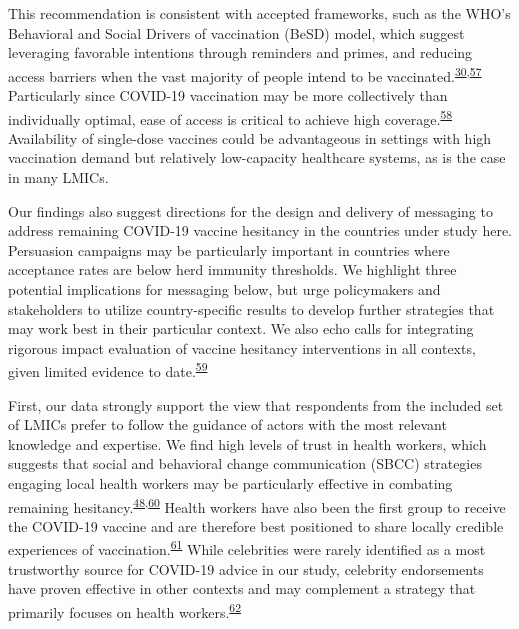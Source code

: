 \documentclass[
  12pt,
]{article}
\begin{document}
This recommendation is consistent with accepted frameworks, such as the WHO's Behavioral and Social Drivers of vaccination (BeSD) model, which suggest leveraging favorable intentions through reminders and primes, and reducing access barriers when the vast majority of people intend to be vaccinated.\textsuperscript{\protect\hyperlink{ref-whodata}{30},\protect\hyperlink{ref-brewer2017increasing}{57}} Particularly since COVID-19 vaccination may be more collectively than individually optimal, ease of access is critical to achieve high coverage.\textsuperscript{\protect\hyperlink{ref-betsch2013inviting}{58}} Availability of single-dose vaccines could be advantageous in settings with high vaccination demand but relatively low-capacity healthcare systems, as is the case in many LMICs.

Our findings also suggest directions for the design and delivery of messaging to address remaining COVID-19 vaccine hesitancy in the countries under study here. Persuasion campaigns may be particularly important in countries where acceptance rates are below herd immunity thresholds. We highlight three potential implications for messaging below, but urge policymakers and stakeholders to utilize country-specific results to develop further strategies that may work best in their particular context. We also echo calls for integrating rigorous impact evaluation of vaccine hesitancy interventions in all contexts, given limited evidence to date.\textsuperscript{\protect\hyperlink{ref-dube2015strategies}{59}}

First, our data strongly support the view that respondents from the included set of LMICs prefer to follow the guidance of actors with the most relevant knowledge and expertise. We find high levels of trust in health workers, which suggests that social and behavioral change communication (SBCC) strategies engaging local health workers may be particularly effective in combating remaining hesitancy.\textsuperscript{\protect\hyperlink{ref-bokemper2021timing}{48},\protect\hyperlink{ref-who2020behavioral}{60}} Health workers have also been the first group to receive the COVID-19 vaccine and are therefore best positioned to share locally credible experiences of vaccination.\textsuperscript{\protect\hyperlink{ref-katzman2021primary}{61}} While celebrities were rarely identified as a most trustworthy source for COVID-19 advice in our study, celebrity endorsements have proven effective in other contexts and may complement a strategy that primarily focuses on health workers.\textsuperscript{\protect\hyperlink{ref-alatas2019celebrities}{62}}
\end{document}
